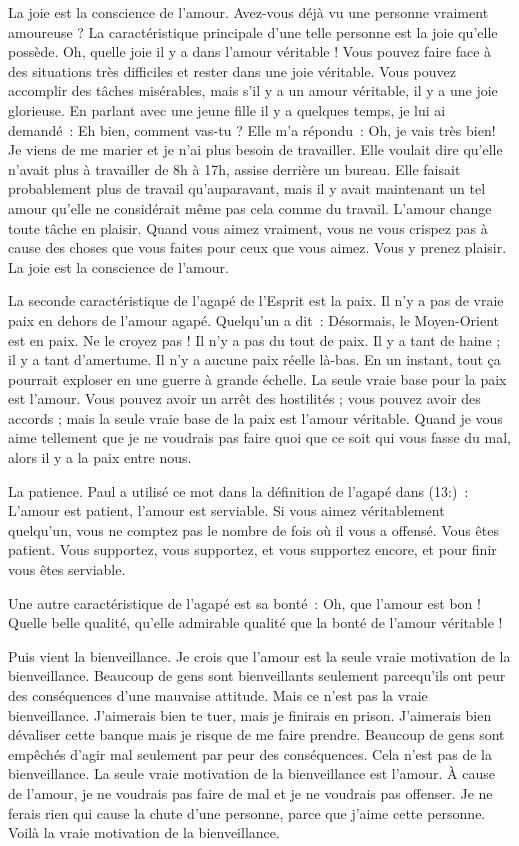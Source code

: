 La joie est la conscience de l'amour.
 Avez-vous déjà vu une personne vraiment amoureuse ?
 La caractéristique principale d'une telle personne est la joie
 qu'elle possède. Oh, quelle joie il y a dans l'amour véritable !
 Vous pouvez faire face à des situations très difficiles
 et rester dans une joie véritable. Vous pouvez accomplir
 des tâches misérables, mais s'il y a un amour véritable,
 il y a une joie glorieuse. En parlant avec une jeune fille
 il y a quelques temps, je lui ai demandé~:
 \og Eh bien, comment vas-tu ? \fg{} Elle m'a répondu~:
 \og Oh, je vais très bien! Je viens de me marier et je n'ai plus besoin
 de travailler. \fg{}
 Elle voulait dire qu'elle n'avait plus à travailler de 8h à 17h,
 assise derrière un bureau. Elle faisait probablement plus de travail
 qu'auparavant, mais il y avait maintenant un tel amour
 qu'elle ne considérait même pas cela comme du travail.
 L'amour change toute tâche en plaisir. Quand vous aimez vraiment,
 vous ne vous crispez pas à cause des choses que vous faites
 pour ceux que vous aimez. Vous y prenez plaisir.
 La joie est la conscience de l'amour.

La seconde caractéristique de l'agapé de l'Esprit est la paix.
 Il n'y a pas de vraie paix en dehors de l'amour agapé.
 Quelqu'un a dit~: \og Désormais, le Moyen-Orient est en paix. \fg{}
 Ne le croyez pas ! Il n'y a pas du tout de paix.
 Il y a tant de haine ; il y a tant d'amertume.
 Il n'y a aucune paix réelle là-bas. En un instant, tout ça pourrait
 exploser en une guerre à grande échelle.
 La seule vraie base pour la paix est l'amour.
 Vous pouvez avoir un arrêt des hostilités ; vous pouvez avoir des accords ;
 mais la seule vraie base de la paix est l'amour véritable.
 Quand je vous aime tellement que je ne voudrais pas faire
 quoi que ce soit qui vous fasse du mal, alors il y a la paix entre nous.

La patience. Paul a utilisé ce mot dans la définition de l'agapé
 dans (13:)~:
 \og L'amour est patient, l'amour est serviable. \fg{}
 Si vous aimez véritablement quelqu'un, vous ne comptez pas
 le nombre de fois où il vous a offensé. Vous êtes patient.
 Vous supportez, vous supportez, et vous supportez encore,
 et pour finir vous êtes serviable.

Une autre caractéristique de l'agapé est sa bonté~:
 Oh, que l'amour est bon ! Quelle belle qualité,
 qu'elle admirable qualité que la bonté de l'amour véritable !

Puis vient la bienveillance. Je crois que l'amour est la seule
 vraie motivation de la bienveillance.
 Beaucoup de gens sont bienveillants seulement parcequ'ils ont peur
 des conséquences d'une mauvaise attitude.
 Mais ce n'est pas la vraie bienveillance.
 \og J'aimerais bien te tuer, mais je finirais en prison. \fg{}
 \og J'aimerais bien dévaliser cette banque mais je risque
 de me faire prendre. \fg{}
 Beaucoup de gens sont empêchés d'agir mal seulement par peur
 des conséquences. Cela n'est pas de la bienveillance.
 La seule vraie motivation de la bienveillance est l'amour.
 À cause de l'amour, je ne voudrais pas faire de mal
 et je ne voudrais pas offenser. Je ne ferais rien qui cause
 la chute d'une personne, parce que j'aime cette personne.
 Voilà la vraie motivation de la bienveillance.

